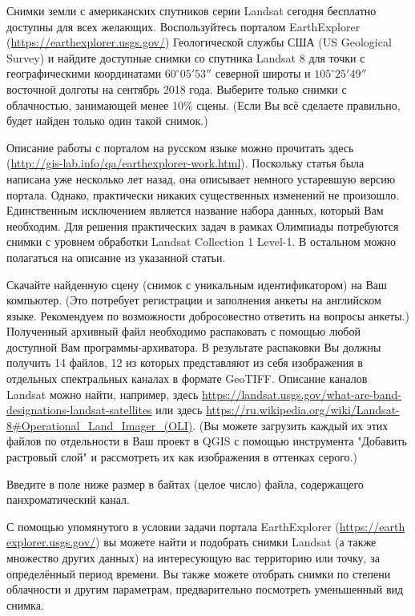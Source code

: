 
Снимки земли с американских спутников серии Landsat сегодня бесплатно доступны для всех желающих. 
Воспользуйтесь порталом EarthExplorer \linebreak (\url{https://earthexplorer.usgs.gov/}) Геологической службы 
США (US Geological \linebreak Survey) и найдите доступные снимки со спутника Landsat 8 для точки 
с географическими координатами $60^{\circ}05'53''$ северной широты и $105^{\circ}25'49''$ восточной долготы 
на сентябрь 2018 года. Выберите только снимки с облачностью, занимающей менее 10\% сцены. 
(Если Вы всё сделаете правильно, будет найден только один такой снимок.)

Описание работы с порталом на русском языке можно прочитать здесь (\url{http://gis-lab.info/qa/earthexplorer-work.html}). 
Поскольку статья была написана уже несколько лет назад, она описывает немного устаревшую версию портала. Однако, практически никаких существенных изменений не произошло. Единственным исключением является название набора данных, который Вам необходим. Для решения практических задач в рамках Олимпиады потребуются снимки с уровнем обработки Landsat Collection 1 Level-1. В остальном можно полагаться на описание из указанной статьи.

Скачайте найденную сцену (снимок с уникальным идентификатором) на Ваш компьютер. 
(Это потребует регистрации и заполнения анкеты на английском языке. Рекомендуем по возможности 
добросовестно ответить на вопросы анкеты.) Полученный архивный файл необходимо распаковать с 
помощью любой доступной Вам программы-архиватора. В результате распаковки Вы должны получить 14 файлов, 
12 из которых представляют из себя изображения в отдельных спектральных каналах в формате GeoTIFF. 
Описание каналов Landsat можно найти, например, здесь \url{https://landsat.usgs.gov/what-are-band-designations-landsat-satellites} или 
здесь \url{https://ru.wikipedia.org/wiki/Landsat-8#Operational_Land_Imager_(OLI)}. (Вы можете загрузить каждый их этих файлов по отдельности в Ваш проект в QGIS с помощью инструмента "Добавить растровый слой" и рассмотреть их как изображения в оттенках серого.)

Введите в поле ниже размер в байтах (целое число) файла, содержащего панхроматический канал.

\explanationSection

С помощью упомянутого в условии задачи портала EarthExplorer (\url{https://earth} \\ \url{explorer.usgs.gov/}) вы можете найти и подобрать снимки Landsat (а также множество других данных) на интересующую вас территорию или точку, за определённый период времени. Вы также можете отобрать снимки по степени облачности и другим параметрам, предварительно посмотреть уменьшенный вид снимка.

